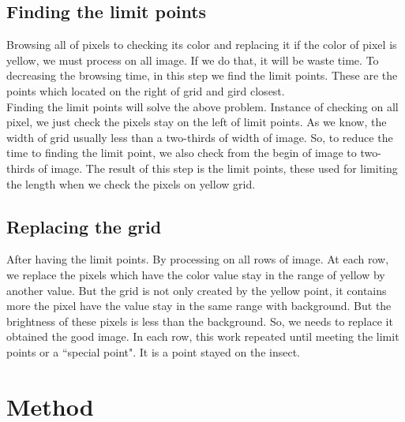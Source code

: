 \subsection{Finding the limit points}
Browsing all of pixels to checking its color and replacing it if the color of pixel is yellow, we must process on all image. If we do that, it will be waste time. To decreasing the browsing time, in this step we find the limit points. These are the points which located on the right of grid and gird closest.\\
Finding the limit points will solve the above problem. Instance of checking on all pixel, we just check the pixels stay on the left of limit points. As we know, the width of grid usually less than a two-thirds of width of image. So, to reduce the time to finding the limit point, we also check from the begin of image to two-thirds of image. The result of this step is the limit points, these used for limiting the length when we check the pixels on yellow grid.
\subsection{Replacing the grid}
After having the limit points. By processing on all rows of image. At each row, we replace the pixels which have the color value stay in the range of yellow by another value. But the grid is not only created by the yellow point, it contains more the pixel have the value stay in the same range with background. But the brightness of these pixels is less than the background. So, we needs to replace it obtained the good image. In each row, this work repeated until meeting the limit points or a ``special point". It is a point stayed on the insect.
\section{Method}






































